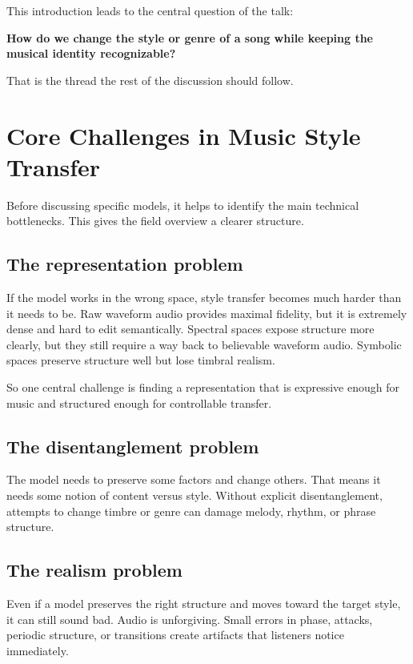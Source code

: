 \documentclass[11pt]{article}
\begin{document}
This introduction leads to the central question of the talk:

\begin{center}
\textbf{How do we change the style or genre of a song while keeping the musical identity recognizable?}
\end{center}

That is the thread the rest of the discussion should follow.

\section{Core Challenges in Music Style Transfer}

Before discussing specific models, it helps to identify the main technical bottlenecks. This gives the field overview a clearer structure.

\subsection{The representation problem}

If the model works in the wrong space, style transfer becomes much harder than it needs to be. Raw waveform audio provides maximal fidelity, but it is extremely dense and hard to edit semantically. Spectral spaces expose structure more clearly, but they still require a way back to believable waveform audio. Symbolic spaces preserve structure well but lose timbral realism.

So one central challenge is finding a representation that is expressive enough for music and structured enough for controllable transfer.

\subsection{The disentanglement problem}

The model needs to preserve some factors and change others. That means it needs some notion of content versus style. Without explicit disentanglement, attempts to change timbre or genre can damage melody, rhythm, or phrase structure.

\subsection{The realism problem}

Even if a model preserves the right structure and moves toward the target style, it can still sound bad. Audio is unforgiving. Small errors in phase, attacks, periodic structure, or transitions create artifacts that listeners notice immediately.
\end{document}
